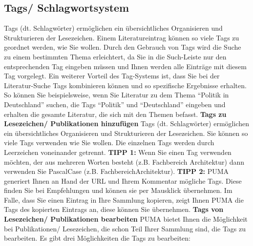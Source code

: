 \documentclass[a4paper,11pt,twoside]{scrbook}
\begin{document}
\subsection{Tags/ Schlagwortsystem}
Tags (dt. Schlagwörter) ermöglichen ein übersichtliches Organisieren und Strukturieren der Lesezeichen. Einem Literatureintrag können so viele Tags zu geordnet werden, wie Sie wollen. Durch den Gebrauch von Tags wird die Suche zu einem bestimmten Thema erleichtert, da Sie in die Such-Leiste nur den entsprechenden Tag eingeben müssen und Ihnen werden alle Einträge mit diesem Tag vorgelegt. Ein weiterer Vorteil des Tag-Systems ist, dass Sie bei der Literatur-Suche  Tags kombinieren können und so spezifische Ergebnisse erhalten. So können Sie beispielsweise, wenn Sie Literatur zu dem Thema \enquote{Politik in Deutschland} suchen, die Tags \enquote{Politik} und \enquote{Deutschland} eingeben und erhalten die gesamte Literatur, die sich mit den Themen befasst. 
\newline
\newline
\textbf{Tags zu Lesezeichen/ Publikationen hinzufügen}\newline
Tags (dt. Schlagwörter) ermöglichen ein übersichtliches Organisieren und Strukturieren der Lesezeichen. Sie können so viele Tags verwenden wie Sie wollen. Die einzelnen Tags werden durch Leerzeichen voneinander getrennt. \newline \textbf{TIPP 1:} Wenn Sie einen Tag verwenden möchten, der aus mehreren Worten besteht (z.B. Fachbereich Architektur) dann verwenden Sie PascalCase (z.B. FachbereichArchitektur). \newline \textbf{TIPP 2:} PUMA generiert Ihnen an Hand der URL und Ihrem Kommentar  mögliche Tags. Diese finden Sie bei Empfehlungen und können sie per Mausklick übernehmen. Im Falle, dass Sie einen Eintrag in Ihre Sammlung kopieren, zeigt Ihnen PUMA die Tags des kopierten Eintrags an, diese können Sie übernehmen.%
\newline
\newline
\textbf{Tags von Lesezeichen/ Publikationen bearbeiten} \newline
PUMA bietet Ihnen die Möglichkeit bei Publikationen/ Lesezeichen, die schon Teil Ihrer Sammlung sind, die Tags zu bearbeiten. Es gibt drei Möglichkeiten die Tags zu bearbeiten:
\end{document}
